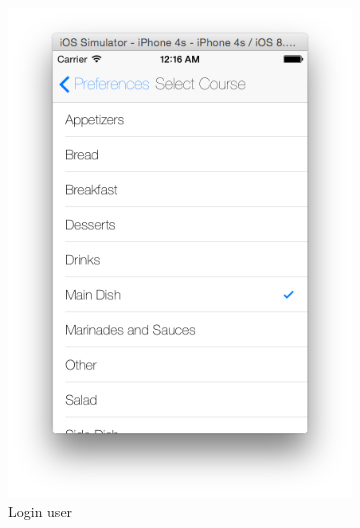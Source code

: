\begin{figure}[h]
\begin{subfigure}{.32\textwidth}
	  		\includegraphics[width=.9\linewidth]{figures/ch4_app_screen_shots/preferences/peferences_course.png}
	  		\caption{Login user}
	  	\end{subfigure}
	  	\begin{subfigure}{.32\textwidth}

\end{subfigure}
\end{figure}
